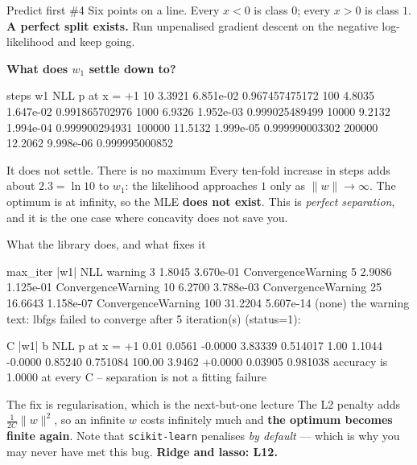 \documentclass[aspectratio=169]{beamer}
\begin{document}
\begin{frame}[fragile,shrink=8]{Predict first \#4}
Six points on a line. Every $x < 0$ is class $0$; every $x > 0$ is class
$1$. \textbf{A perfect split exists.} Run unpenalised gradient descent on
the negative log-likelihood and keep going.

\begin{center}
  \textbf{What does $w_1$ settle down to?}
\end{center}
\vspace{0.2em}
\begin{outblk}
  steps        w1          NLL        p at x = +1
     10      3.3921   6.851e-02   0.967457475172
    100      4.8035   1.647e-02   0.991865702976
   1000      6.9326   1.952e-03   0.999025489499
  10000      9.2132   1.994e-04   0.999900294931
 100000     11.5132   1.999e-05   0.999990003302
 200000     12.2062   9.998e-06   0.999995000852
\end{outblk}
\begin{alertblock}{It does not settle. There is no maximum}
  \footnotesize Every ten-fold increase in steps adds about $2.3 = \ln 10$
  to $w_1$: the likelihood approaches $1$ only as
  $\lVert w\rVert \to \infty$. The optimum is at infinity, so the MLE
  \textbf{does not exist}. This is \emph{perfect separation}, and it is the
  one case where concavity does not save you.
\end{alertblock}
\end{frame}

\begin{frame}[fragile,shrink=8]{What the library does, and what fixes it}
\begin{outblk}
max_iter   |w1|        NLL          warning
       3     1.8045  3.670e-01    ConvergenceWarning
       5     2.9086  1.125e-01    ConvergenceWarning
      10     6.2700  3.788e-03    ConvergenceWarning
      25    16.6643  1.158e-07    ConvergenceWarning
     100    31.2204  5.607e-14    (none)
the warning text: lbfgs failed to converge after 5 iteration(s) (status=1):
\end{outblk}
\begin{outblk}
       C      |w1|       b        NLL      p at x = +1
    0.01    0.0561  -0.0000   3.83339    0.514017
    1.00    1.1044  -0.0000   0.85240    0.751084
  100.00    3.9462  +0.0000   0.03905    0.981038
accuracy is 1.0000 at every C -- separation is not a fitting failure
\end{outblk}
\begin{alertblock}{The fix is regularisation, which is the next-but-one lecture}
  \footnotesize The L2 penalty adds $\tfrac{1}{2C}\lVert w\rVert^2$, so an
  infinite $w$ costs infinitely much and \textbf{the optimum becomes finite
  again}. Note that \texttt{scikit-learn} penalises \emph{by default} ---
  which is why you may never have met this bug. \textbf{Ridge and lasso:
  L12.}
\end{alertblock}
\end{frame}
\end{document}
